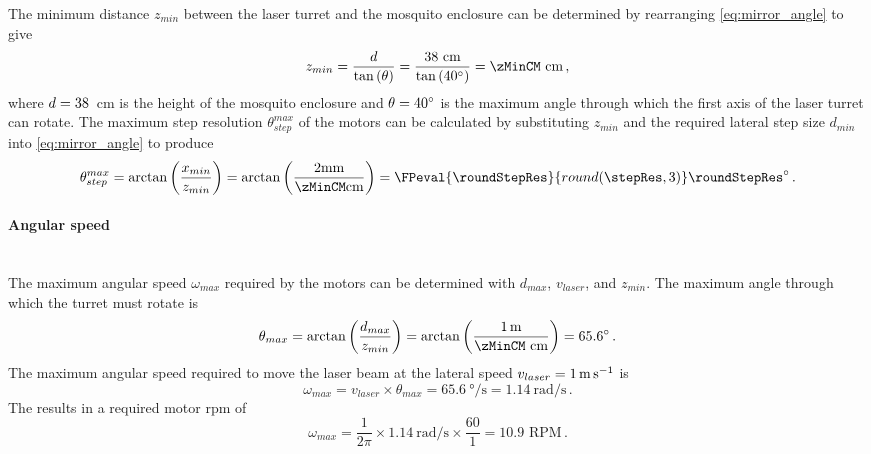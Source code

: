 The minimum distance $z_{min}$ between the laser turret and the mosquito enclosure can be determined by rearranging \autoref{eq:mirror_angle} to give
\begin{equation}
    z_{min} = \frac{d}{\tan\left(\theta\right)} = \frac{\enclosureHeightCM \text{ cm}}{\tan\left(40\degree\right)} = \zMinCM \text{ cm}\,,
\end{equation}
where $d = 38$~cm is the height of the mosquito enclosure and $\theta = 40^{\circ}$ is the maximum angle through which the first axis of the laser turret can rotate. The maximum step resolution $\theta_{step}^{max}$ of the motors can be calculated by substituting $z_{min}$ and the required lateral step size $d_{min}$ into \autoref{eq:mirror_angle} to produce
\begin{equation}
    \theta_{step}^{max} = \arctan\left({\frac{x_{min}}{z_{min}}}\right) = \arctan\left({\frac{\requiredLatStepSizeMM \text{mm}}{\zMinCM \text{cm}}}\right) = \FPeval{\roundStepRes}{round(\stepRes, 3)}\roundStepRes\degree\,.
    \label{eq:max_step_resolution}
\end{equation}


\paragraph{Angular speed}\mbox{}\\
The maximum angular speed $\omega_{max}$ required by the motors can be determined with $d_{max}$, $v_{laser}$, and $z_{min}$. The maximum angle through which the turret must rotate is
\begin{equation}
    \theta_{max} = \arctan\left({\frac{d_{max}}{z_{min}}}\right) = \arctan\left({\frac{\SI{1}{\meter}}{\zMinCM \text{ cm}}}\right) = 65.6\degree\,.
\end{equation}
The maximum angular speed required to move the laser beam at the lateral speed $v_{laser} = \SI{1}{\meter\per\second}$ is
\begin{equation}
    \omega_{max} = v_{laser} \times \theta_{max} = \SI{65.6}{\degree\per\second} = \SI{1.14}{\radian\per\second}\,.
\end{equation}
The results in a required motor \gls{rpm} of
\begin{equation}
    \omega_{max} = \frac{1}{2\pi} \times \SI{1.14}{\radian\per\second} \times \frac{60}{1} = 10.9 \text{ RPM}\,.
\end{equation}



